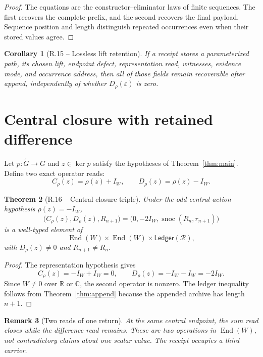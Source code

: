 \documentclass[11pt,letterpaper]{article}
\theoremstyle{returnstyle}
\newtheorem{theorem}{Theorem}[section]
\newtheorem{corollary}[theorem]{Corollary}
\newtheorem{remark}[theorem]{Remark}
\newcommand{\R}{\mathbb{R}}
\newcommand{\C}{\mathbb{C}}
\newcommand{\End}{\operatorname{End}}
\newcommand{\Ledger}{\mathsf{Ledger}}
\newcommand{\snoc}{\operatorname{snoc}}
\begin{document}
\begin{proof}
The equations are the constructor--eliminator laws of finite sequences.  The first recovers the complete prefix, and the second recovers the final payload.  Sequence position and length distinguish repeated occurrences even when their stored values agree.
\end{proof}

\begin{corollary}[R.15 -- Lossless lift retention]
If a receipt stores a parameterized path, its chosen lift, endpoint defect, representation read, witnesses, evidence mode, and occurrence address, then all of those fields remain recoverable after append, independently of whether $D_\rho(\varepsilon)$ is zero.
\end{corollary}

\section{Central closure with retained difference}\label{sec:central}

Let $p:\widetilde G\to G$ and $z\in\ker p$ satisfy the hypotheses of Theorem~\ref{thm:main}.  Define two exact operator reads:
\begin{equation}\label{eq:closure-diff}
C_\rho(z)=\rho(z)+I_W,
\qquad
D_\rho(z)=\rho(z)-I_W.
\end{equation}

\begin{theorem}[R.16 -- Central closure triple]\label{thm:central}
Under the odd central-action hypothesis $\rho(z)=-I_W$,
\begin{equation}\label{eq:central-triple}
\bigl(C_\rho(z),D_\rho(z),R_{n+1}\bigr)
=
\bigl(0,-2I_W,\snoc(R_n,r_{n+1})\bigr)
\end{equation}
is a well-typed element of
\[
\End(W)\times\End(W)\times\Ledger(\mathcal R),
\]
with $D_\rho(z)\ne0$ and $R_{n+1}\ne R_n$.
\end{theorem}

\begin{proof}
The representation hypothesis gives
\[
C_\rho(z)=-I_W+I_W=0,
\qquad
D_\rho(z)=-I_W-I_W=-2I_W.
\]
Since $W\ne0$ over $\R$ or $\C$, the second operator is nonzero.  The ledger inequality follows from Theorem~\ref{thm:append} because the appended archive has length $n+1$.
\end{proof}

\begin{remark}[Two reads of one return]
At the same central endpoint, the sum read closes while the difference read remains.  These are two operations in $\End(W)$, not contradictory claims about one scalar value.  The receipt occupies a third carrier.
\end{remark}
\end{document}

